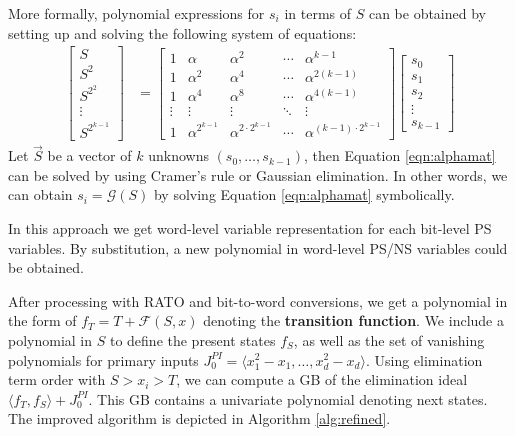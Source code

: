 More formally, polynomial expressions for $s_i$ in terms of $S$ can be
obtained by setting up and solving the following system of equations:
\begin{align}
\label{eqn:alphamat}
\begin{bmatrix}
S \\
S^2 \\
S^{2^2} \\
\vdots \\
S^{2^{k-1}}
\end{bmatrix}
&=
\begin{bmatrix}
1 & \alpha & \alpha^{2} & \cdots & \alpha^{{k-1}}\\
1 & \alpha^{2} & \alpha^{4} & \cdots & \alpha^{2(k-1)} \\
1 & \alpha^{4} & \alpha^{8} & \cdots & \alpha^{4(k-1)}\\
\vdots & \vdots & \vdots & \ddots & \vdots \\
1 & \alpha^{2^{k-1}} & \alpha^{2\cdot 2^{k-1}} & \cdots & \alpha^{(k-1)\cdot 2^{k-1}}
\end{bmatrix}
\begin{bmatrix}
s_0\\
s_1\\
s_2\\
\vdots\\
s_{k-1}
\end{bmatrix}
\end{align}
Let $\vec{S}$ be a vector of $k$ unknowns $(s_0,\dots,s_{k-1})$,
then Equation \ref{eqn:alphamat} can be solved by using Cramer's rule or Gaussian elimination.
In other words, we can obtain $s_i=\mathcal G(S)$ by solving Equation \ref{eqn:alphamat} symbolically.

In this approach we get word-level variable representation for each bit-level PS variables. 
By substitution, a new polynomial in word-level PS/NS variables could be obtained.

After processing with RATO and bit-to-word conversions, we get a polynomial in the 
form of $f_T = T+\mathcal{F}(S,x)$
denoting the {\bf transition function}. We include a polynomial in $S$ to define the present states $f_S$,
as well as the set of vanishing polynomials for primary inputs 
$J_0^{PI} = \langle x_1^2-x_1,\dots,x_d^2-x_d\rangle$. Using elimination term order with $S>x_i>T$,
we can compute a GB of the elimination ideal $\langle f_T,f_S\rangle + J_0^{PI}$. This GB contains a univariate
polynomial denoting next states. The improved algorithm is depicted in Algorithm \ref{alg:refined}.

